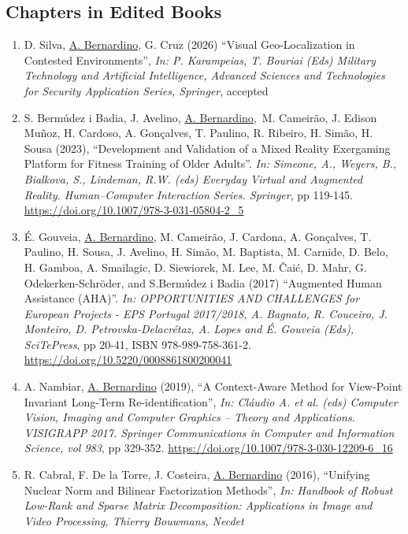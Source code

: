 \documentclass[
]{article}
\begin{document}
\subsection{Chapters in Edited Books}\label{chapters-in-edited-books}

\begin{enumerate}
\def\labelenumi{\arabic{enumi}.}
\item
  D. Silva, \ul{A. Bernardino}, G. Cruz (2026) ``Visual Geo-Localization
  in Contested Environments'', \emph{In: P. Karampeias, T. Bouriai (Eds)
  Military Technology and Artificial Intelligence, Advanced Sciences and
  Technologies for Security Application Series, Springer}, accepted
\item
  S. Bermúdez i Badia, J. Avelino, \ul{A. Bernardino},~M. Cameirão, J.
  Edison Muñoz, H. Cardoso, A. Gonçalves, T. Paulino, R. Ribeiro, H.
  Simão, H. Sousa (2023), ``Development and Validation of a Mixed
  Reality Exergaming Platform for Fitness Training of Older Adults''.
  \emph{In: Simeone, A., Weyers, B., Bialkova, S., Lindeman, R.W. (eds)
  Everyday Virtual and Augmented Reality. Human--Computer Interaction
  Series. Springer}, pp 119-145.
  \url{https://doi.org/10.1007/978-3-031-05804-2_5}
\item
  É. Gouveia, \ul{A. Bernardino}, M. Cameirão, J. Cardona, A. Gonçalves,
  T. Paulino, H. Sousa, J. Avelino, H. Simão, M. Baptista, M. Carnide,
  D. Belo, H. Gamboa, A. Smailagic, D. Siewiorek, M. Lee, M. Čaić, D.
  Mahr, G. Odekerken-Schröder, and S.Bermúdez i Badia (2017) ``Augmented
  Human Assistance (AHA)''. \emph{In: OPPORTUNITIES AND CHALLENGES for
  European Projects - EPS Portugal 2017/2018, A. Bagnato, R. Couceiro,
  J. Monteiro, D. Petrovska-Delacrétaz, A. Lopes and É. Gouveia (Eds),
  SciTePress}, pp 20-41, ISBN 978-989-758-361-2.
  \url{https://doi.org/10.5220/0008861800200041}~
\item
  A. Nambiar, \ul{A. Bernardino} (2019), ``A Context-Aware Method for
  View-Point Invariant Long-Term Re-identification'', \emph{In: Cláudio
  A. et al. (eds) Computer Vision, Imaging and Computer Graphics --
  Theory and Applications. VISIGRAPP 2017. Springer Communications in
  Computer and Information Science, vol 983}, pp 329-352\emph{.}
  \url{https://doi.org/10.1007/978-3-030-12209-6_16}~
\item
  R. Cabral, F. De la Torre, J. Costeira, \ul{A. Bernardino} (2016),
  ``Unifying Nuclear Norm and Bilinear Factorization Methods'',
  \emph{In: Handbook of Robust Low-Rank and Sparse Matrix Decomposition:
  Applications in Image and Video Processing, Thierry Bouwmans, Necdet
}
\end{enumerate}
\end{document}
